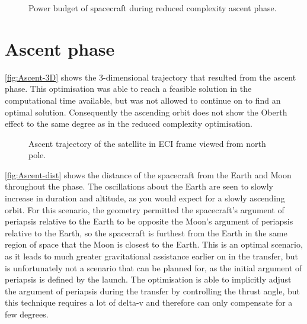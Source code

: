 \begin{figure}
\centering
\def\svgwidth{\figurewidth}

\caption{Power budget of spacecraft during reduced complexity ascent phase.} \label{fig:Ascent2-energy}
\end{figure}


\clearpage


\section{Ascent phase} \label{sec:Ascent}

\autoref{fig:Ascent-3D} shows the 3-dimensional trajectory that resulted from the ascent phase. This optimisation was able to reach a feasible solution in the computational time available, but was not allowed to continue on to find an optimal solution. Consequently the ascending orbit does not show the Oberth effect to the same degree as in the reduced complexity optimisation.

\begin{figure}[h]
\centering
\def\svgwidth{\figurewidth}

\caption{Ascent trajectory of the satellite in ECI frame viewed from north pole.} \label{fig:Ascent-3D}
\end{figure}

\autoref{fig:Ascent-dist} shows the distance of the spacecraft from the Earth and Moon throughout the phase. The oscillations about the Earth are seen to slowly increase in duration and altitude, as you would expect for a slowly ascending orbit. %
For this scenario, the geometry permitted the spacecraft’s argument of periapsis relative to the Earth to be opposite the Moon’s argument of periapsis relative to the Earth, so the spacecraft is furthest from the Earth in the same region of space that the Moon is closest to the Earth.
This is an optimal scenario, as it leads to much greater gravitational assistance earlier on in the transfer, but is unfortunately not a scenario that can be planned for, as the initial argument of periapsis is defined by the launch. The optimisation is able to implicitly adjust the argument of periapsis during the transfer by controlling the thrust angle, but this technique requires a lot of delta-v and therefore can only compensate for a few degrees.

